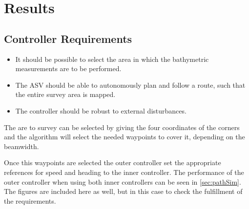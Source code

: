 \chapter{Results}\label{chap:results}

\section{Controller Requirements}
\begin{itemize}
    \item It should be possible to select the area in which the bathymetric measurements are to be performed.
    \item The ASV should be able to autonomously plan and follow a route, such that the entire survey area is mapped.
    \item The controller should be robust to external disturbances.
\end{itemize}

The are to survey can be selected by giving the four coordinates of the corners and the algorithm will select the needed waypoints to cover it, depending on the beamwidth.

Once this waypoints are selected the outer controller set the appropriate references for speed and heading to the inner controller. The performance of the outer controller when using both inner controllers can be seen in \autoref{sec:pathSim}. The figures are included here as well, but in this case to check the fulfillment of the requirements.


